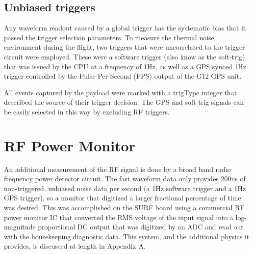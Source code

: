 		
		
	\subsection{Unbiased triggers}
		Any waveform readout caused by a global trigger has the systematic bias that it passed the trigger selection parameters.  To measure the thermal noise environment during the flight, two triggers that were uncorrelated to the trigger circuit were employed.  These were a software trigger (also know as the soft-trig) that was issued by the CPU at a frequency of 1Hz, as well as a GPS synced 1Hz trigger controlled by the Pulse-Per-Second (PPS) output of the G12 GPS unit.
		
		All events captured by the payload were marked with a trigType integer that described the source of their trigger decision.  The GPS and soft-trig signals can be easily selected in this way by excluding RF triggers.
		
		
\section{RF Power Monitor}
	An additional measurement of the RF signal is done by a broad band radio frequency power detector circuit.  The fast waveform data only provides 200ns of non-triggered, unbiased noise data per second (a 1Hz software trigger and a 1Hz GPS trigger), so a monitor that digitized a larger fractional percentage of time was desired.  This was accomplished on the SURF board using a commercial RF power monitor IC that converted the RMS voltage of the input signal into a log-magnitude proportional DC output that was digitized by an ADC and read out with the housekeeping diagnostic data.  This system, and the additional physics it provides, is discussed at length in Appendix A.

